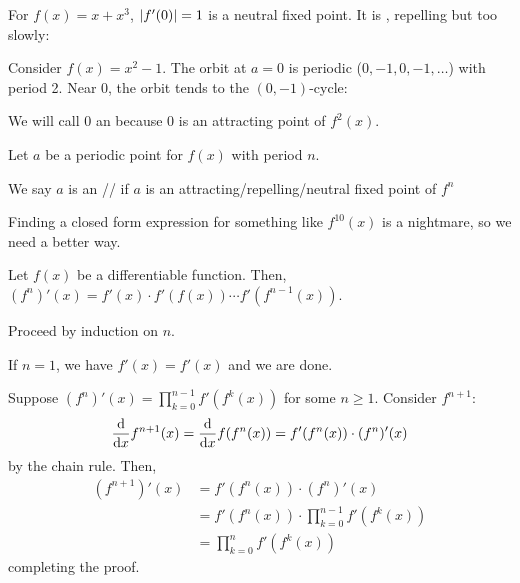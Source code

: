 \documentclass[class=pmath370,tikz,notes]{agony}
\begin{document}
\begin{example}
  For $f(x) = x + x^3$, $\abs{f'(0)} = 1$ is a neutral fixed point.
  It is ,
  repelling but too slowly:
  \begin{center}
    \quad
  \end{center}
\end{example}

\begin{example}
  Consider $f(x) = x^2 - 1$.
  The orbit at $a = 0$ is periodic ($0,-1,0,-1,\dots$) with period 2.
  Near 0, the orbit tends to the $(0,-1)$-cycle:
  \begin{center}
  \end{center}
  We will call 0 an 
  because 0 is an attracting point of $f^2(x)$.
\end{example}



\begin{defn}
  Let $a$ be a periodic point for $f(x)$ with period $n$.

  We say $a$ is an //
  if $a$ is an attracting/repelling/neutral fixed point of $f^n$
\end{defn}

Finding a closed form expression for something like $f^{10}(x)$
is a nightmare, so we need a better way.

\begin{prop}
  Let $f(x)$ be a differentiable function.
  Then, $(f^n)'(x) = f'(x)\cdot f'(f(x))\dotsb f'(f^{n-1}(x))$.
\end{prop}
\begin{prf}
  Proceed by induction on $n$.

  If $n=1$, we have $f'(x) = f'(x)$ and we are done.

  Suppose $(f^n)'(x) = \prod_{k=0}^{n-1} f'(f^k(x))$ for some $n \geq 1$.
  Consider $f^{n+1}$:
  \begin{align*}
    \dv{x} f^{n+1}(x) = \dv{x} f(f^n(x)) = f'(f^n(x))\cdot(f^n)'(x)
  \end{align*}
  by the chain rule. Then,
  \begin{align*}
    (f^{n+1})'(x)
     & = f'(f^n(x))\cdot(f^n)'(x)                    \\
     & = f'(f^n(x))\cdot\prod_{k=0}^{n-1} f'(f^k(x)) \\
     & = \prod_{k=0}^{n} f'(f^k(x))
  \end{align*}
  completing the proof.
\end{prf}
\end{document}
